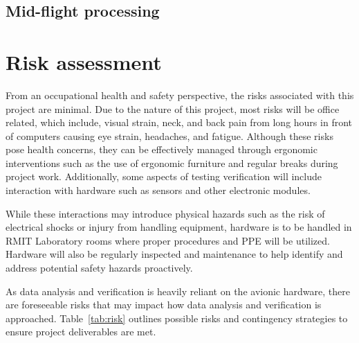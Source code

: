 \subsection{Mid-flight processing}

\section{Risk assessment}
From an occupational health and safety perspective, the risks associated with this project are minimal. Due to the nature of this project, most risks will be office related, which include, visual strain, neck, and back pain from long hours in front of computers causing eye strain, headaches, and fatigue. Although these risks pose health concerns, they can be effectively managed through ergonomic interventions such as the use of ergonomic furniture and regular breaks during project work. Additionally, some aspects of testing verification will include interaction with hardware such as sensors and other electronic modules. 

While these interactions may introduce physical hazards such as the risk of electrical shocks or injury from handling equipment, hardware is to be handled in RMIT Laboratory rooms where proper procedures and PPE will be utilized. Hardware will also be regularly inspected and maintenance to help identify and address potential safety hazards proactively.  

As data analysis and verification is heavily reliant on the avionic hardware, there are foreseeable risks that may impact how data analysis and verification is approached. Table~\ref{tab:risk} outlines possible risks and contingency strategies to ensure project deliverables are met.  

